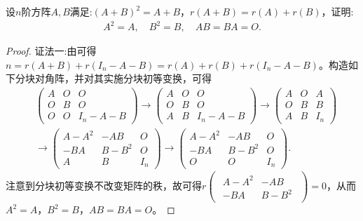 \documentclass[../../main.tex]{subfiles}%
\begin{document}
\begin{example}
设$n$阶方阵$A,B$满足:$(A+B)^2=A+B$，$r(A+B)=r(A)+r(B)$，证明:
\begin{align*}
A^2=A, \quad B^2=B, \quad AB=BA=O.
\end{align*}
\end{example}
\begin{proof}

{\color{blue}证法一:}由可得$n=r(A+B)+r(I_n - A - B)=r(A)+r(B)+r(I_n - A - B)$。构造如下分块对角阵，并对其实施分块初等变换，可得
\begin{align*}
&\begin{pmatrix}
A & O & O \\
O & B & O \\
O & O & I_n - A - B
\end{pmatrix} \to \begin{pmatrix}
A & O & O \\
O & B & O \\
A & B & I_n - A - B
\end{pmatrix} \to \begin{pmatrix}
A & O & A \\
O & B & B \\
A & B & I_n
\end{pmatrix} \\
&\to \begin{pmatrix}
A - A^2 & -AB & O \\
-BA & B - B^2 & O \\
A & B & I_n
\end{pmatrix} \to \begin{pmatrix}
A - A^2 & -AB & O \\
-BA & B - B^2 & O \\
O & O & I_n
\end{pmatrix}.
\end{align*}
注意到分块初等变换不改变矩阵的秩，故可得$r\begin{pmatrix}\begin{array}{cc}A - A^2 & -AB \\ -BA & B - B^2\end{array}\end{pmatrix}=0$，从而$A^2=A$，$B^2=B$，$AB=BA=O$。


\end{proof}
\end{document}
